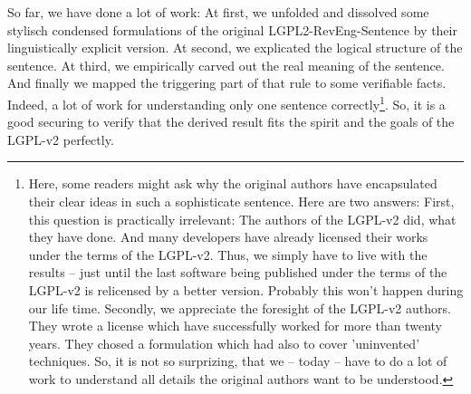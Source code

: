 %
%
%
%
%

So far, we have done a lot of work: At first, we unfolded and dissolved some
stylisch condensed formulations of the original LGPL2-RevEng-Sentence by their
linguistically explicit version. At second, we explicated the logical structure
of the sentence. At third, we empirically carved out the real meaning of the
sentence. And finally we mapped the triggering part of that rule to some
verifiable facts. Indeed, a lot of work for understanding only one sentence
correctly\footnote{Here, some readers might ask why the original authors have
encapsulated their clear ideas in such a sophisticate sentence. Here are two
answers: First, this question is practically irrelevant: The authors of the
LGPL-v2 did, what they have done. And many developers have already licensed
their works under the terms of the LGPL-v2. Thus, we simply have to live with
the results -- just until the last software being published under the terms of
the LGPL-v2 is relicensed by a better version. Probably this won't happen during
our life time. Secondly, we appreciate the foresight of the LGPL-v2 authors.
They wrote a license which have successfully worked for more than twenty years.
They chosed a formulation which had also to cover 'uninvented' techniques. So,
it is not so surprizing, that we -- today -- have to do a lot of work to
understand all details the original authors want to be understood.}. So, it is a
good securing to verify that the derived result fits the spirit and the goals of
the LGPL-v2 perfectly. 

